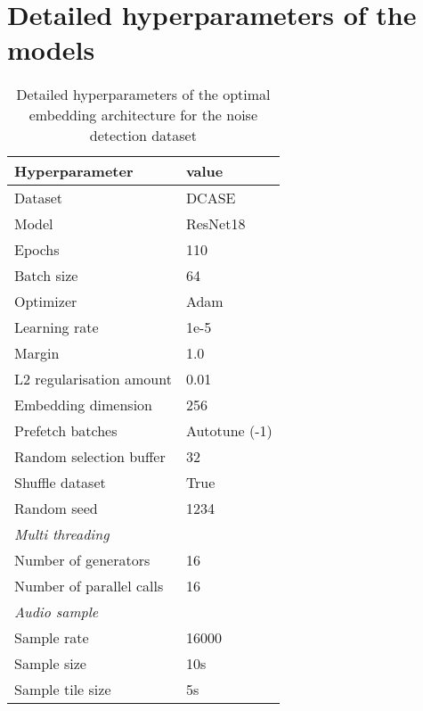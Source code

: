 

\chapter{Detailed hyperparameters of the models}
\label{app:detailed-hyperparameters}

\begin{table}[ht]
    \centering
    \caption{Detailed hyperparameters of the optimal embedding architecture for the noise detection dataset}
	\label{tab:Hyperparameters-Detailed-DCASE}
    \begin{tabular}{l|l}
        \toprule
        \textbf{Hyperparameter} & \textbf{value} \\ 
        \midrule[1pt]
        Dataset & DCASE \\
        \hline
        Model & ResNet18 \\ 
        \hline
        Epochs & 110 \\ 
        \hline
        Batch size & 64 \\ 
        \hline
        Optimizer & Adam \\ 
        \hline
        Learning rate & 1e-5 \\
        \hline
        Margin & 1.0 \\
        \hline
        L2 regularisation amount & 0.01 \\
        \hline
        Embedding dimension & 256 \\
        \hline
        Prefetch batches & Autotune (-1) \\ 
        \hline
        Random selection buffer & 32 \\ 
        \hline
        Shuffle dataset & True \\
        \hline
        Random seed & 1234 \\
        \midrule[1pt]
        \multicolumn{2}{l}{\textit{Multi threading}} \\
        \midrule[1pt]
        Number of generators & 16 \\ 
        \hline
        Number of parallel calls & 16 \\
        \midrule[1pt]
        \multicolumn{2}{l}{\textit{Audio sample}} \\
        \midrule[1pt]
        Sample rate & 16000 \\ 
        \hline
        Sample size & 10s \\
        \hline
        Sample tile size & 5s \\

\end{tabular}
\end{table}
